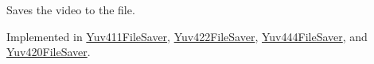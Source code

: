 Saves the video to the file. 



Implemented in \hyperlink{classPlayer_1_1Yuv411FileSaver_aae2c382151ef7c9aa913361172b30db6}{Yuv411\+File\+Saver}, \hyperlink{classPlayer_1_1Yuv422FileSaver_aae2c382151ef7c9aa913361172b30db6}{Yuv422\+File\+Saver}, \hyperlink{classPlayer_1_1Yuv444FileSaver_aae2c382151ef7c9aa913361172b30db6}{Yuv444\+File\+Saver}, and \hyperlink{classPlayer_1_1Yuv420FileSaver_aae2c382151ef7c9aa913361172b30db6}{Yuv420\+File\+Saver}.

